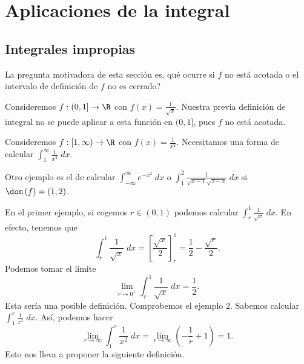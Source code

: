 \chapter{Aplicaciones de la integral}
\section{Integrales impropias}
La pregunta motivadora de esta sección es, qué ocurre si $\displaystyle f $ no está acotada o el intervalo de definición de $\displaystyle f $ no es cerrado?
\begin{eg}
	\normalfont Consideremos $\displaystyle f: (0,1] \to \R $ con $\displaystyle f\left(x\right) = \frac{1}{\sqrt{x}} $. Nuestra previa definición de integral no se puede aplicar a esta función en $\displaystyle (0,1] $, pues $\displaystyle f $ no está acotada.
\end{eg}
\begin{eg}
\normalfont Consideremos $\displaystyle f : [1,\infty) \to \R $ con $\displaystyle f\left(x\right) = \frac{1}{x^{2}} $. Necesitamos una forma de calcular $\displaystyle \int^{\infty}_{1} \frac{1}{x^{2}} \; dx$. 
\end{eg}
\begin{eg}
\normalfont Otro ejemplo es el de calcular $\displaystyle \int^{\infty}_{-\infty} e^{-x^{2}} \; dx $ o $\displaystyle \int^{2}_{1} \frac{1}{\sqrt{x-1}\sqrt{2-x}} \; dx$ si $\displaystyle \dom\left(f\right) = \left(1,2\right) $.
\end{eg}
En el primer ejemplo, si cogemos $\displaystyle r \in \left(0,1\right) $ podemos calcular $\displaystyle \int^{1}_{r} \frac{1}{\sqrt{x}} \; dx $. En efecto, tenemos que 
\[ \int^{1}_{r} \frac{1}{\sqrt{x}} \; dx = \left[\frac{\sqrt{x}}{2}\right] ^{1}_{r} = \frac{1}{2}-\frac{\sqrt{r}}{2} .\]
Podemos tomar el límite
\[\lim_{r \to 0^{+}}\int^{1}_{r} \frac{1}{\sqrt{x}} \; dx = \frac{1}{2} .\]
Esta sería una posible definición. Comprobemos el ejemplo 2. Sabemos calcular $\displaystyle \int^{r}_{1} \frac{1}{x^{2}} \; dx$. Así, podemos hacer
\[\lim_{r \to \infty}\int^{r}_{1} \frac{1}{x^{2}} \; dx = \lim_{r \to \infty}\left(-\frac{1}{r}+1\right) = 1.\]
Esto nos lleva a proponer la siguiente definición.
